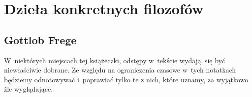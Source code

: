 \documentclass[a4paper,11pt]{article}
\begin{document}










\newpage

\section{Dzieła konkretnych filozofów}

\vspace{\spaceTwo}





\subsection{Gottlob Frege}

\vspace{\spaceTwo}



\vspace{0em}



\vspace{0em}


\noindent
W~niektórych miejscach tej książeczki, odstępy w~tekście wydają~się być
niewłaściwie dobrane. Ze względu na ograniczenia czasowe w~tych notatkach
będziemy odnotowywać i~poprawiać tylko te z nich, które uznamy, za
wyjątkowo źle wyglądające.

\vspace{\spaceFour}








\end{document}
